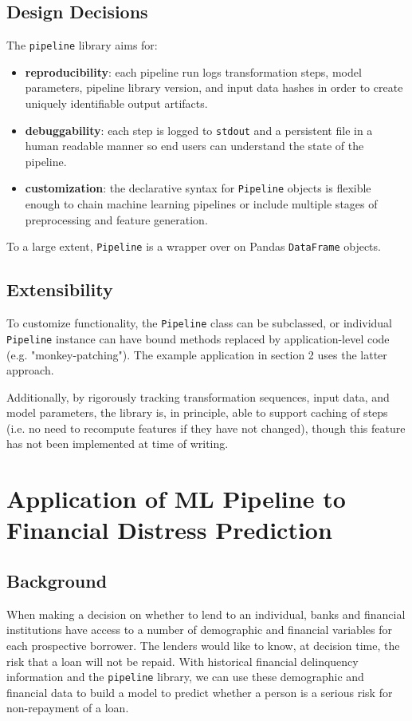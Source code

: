 \documentclass[11pt]{article}
\begin{document}
\subsection{Design Decisions}
The \texttt{pipeline} library aims for:
\begin{itemize}
\item \textbf{reproducibility}: each pipeline run logs transformation steps, model parameters, pipeline library version, and input data hashes in order to create uniquely identifiable output artifacts. 
\item \textbf{debuggability}: each step is logged to \texttt{stdout} and a persistent file in a human readable manner so end users can understand the state of the pipeline. 
\item \textbf{customization}: the declarative syntax for \texttt{Pipeline} objects is flexible enough to chain machine learning pipelines or include multiple stages of preprocessing and feature generation.
\end{itemize}

To a large extent, \texttt{Pipeline} is a wrapper over on Pandas \texttt{DataFrame} objects. 
\subsection{Extensibility}
To customize functionality, the \texttt{Pipeline} class can be subclassed, or individual \texttt{Pipeline} instance can have bound methods replaced by application-level code (e.g. "monkey-patching"). The example application in section 2 uses the latter approach. 

Additionally, by rigorously tracking transformation sequences, input data, and model parameters, the library is, in principle, able to support caching of steps (i.e. no need to recompute features if they have not changed), though this feature has not been implemented at time of writing.

\pagebreak
\section{Application of ML Pipeline to Financial Distress Prediction}
\subsection{Background}
When making a decision on whether to lend to an individual, banks and financial institutions have access to a number of demographic and financial variables for each prospective borrower. The lenders would like to know, at decision time, the risk that a loan will not be repaid. With historical financial delinquency information and the \texttt{pipeline} library, we can use these demographic and financial data to build a model to predict whether a person is a serious risk for non-repayment of a loan.
\end{document}
